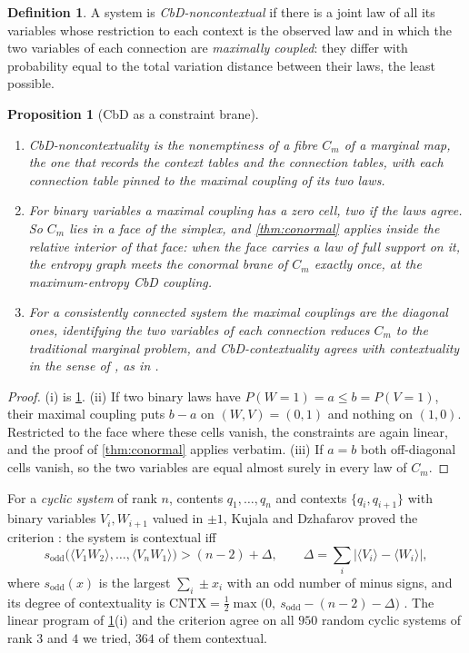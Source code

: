 \documentclass[11pt]{article}
\newtheorem{proposition}[theorem]{Proposition}
\theoremstyle{definition}
\newtheorem{definition}[theorem]{Definition}
\theoremstyle{remark}
\begin{document}
\begin{definition}\label{def:cbd}
A system is \emph{CbD-noncontextual} if there is a joint law of all its variables whose restriction to each context is the observed law
and in which the two variables of each connection are \emph{maximally coupled}: they differ with probability equal to the total variation
distance between their laws, the least possible.
\end{definition}

\begin{proposition}[CbD as a constraint brane]\label{prop:cbdbrane}
\begin{enumerate}[label=(\roman*)]
\item CbD-noncontextuality is the nonemptiness of a fibre $C_m$ of a marginal map, the one that records the context tables and the
  connection tables, with each connection table pinned to the maximal coupling of its two laws.
\item For binary variables a maximal coupling has a zero cell, two if the laws agree. So $C_m$ lies in a face of the simplex, and
  \cref{thm:conormal} applies inside the relative interior of that face: when the face carries a law of full support on it, the entropy
  graph meets the conormal brane of $C_m$ exactly once, at the maximum-entropy CbD coupling.
\item For a consistently connected system the maximal couplings are the diagonal ones, identifying the two variables of each
  connection reduces $C_m$ to the traditional marginal problem, and CbD-contextuality agrees with contextuality in the sense of
  \cite{AbramskyBrandenburger2011}, as in \cite{DzhafarovKujala2016}.
\end{enumerate}
\end{proposition}
\begin{proof}
(i) is \cref{def:cbd}. (ii) If two binary laws have $P(W=1)=a\le b=P(V=1)$, their maximal coupling puts $b-a$ on $(W,V)=(0,1)$ and nothing on
$(1,0)$. Restricted to the face where these cells vanish, the constraints are again linear, and the proof of \cref{thm:conormal} applies
verbatim. (iii) If $a=b$ both off-diagonal cells vanish, so the two variables are equal almost surely in every law of $C_m$.
\end{proof}

For a \emph{cyclic system} of rank $n$, contents $q_1,\dots,q_n$ and contexts $\{q_i,q_{i+1}\}$ with binary variables $V_i,W_{i+1}$ valued in
$\pm1$, Kujala and Dzhafarov proved the criterion \cite{KujalaDzhafarov2016}: the system is contextual iff
\[
s_{\mathrm{odd}}\bigl(\langle V_1W_2\rangle,\dots,\langle V_nW_1\rangle\bigr)>(n-2)+\Delta,\qquad \Delta=\sum_i\bigl\lvert\langle V_i\rangle-\langle W_i\rangle\bigr\rvert,
\]
where $s_{\mathrm{odd}}(x)$ is the largest $\sum_i\pm x_i$ with an odd number of minus signs, and its degree of contextuality is
$\mathrm{CNTX}=\frac12\max\bigl(0,\ s_{\mathrm{odd}}-(n-2)-\Delta\bigr)$ \cite{KujalaDzhafarov2019}. The linear program of
\cref{prop:cbdbrane}(i) and the criterion agree on all $950$ random cyclic systems of rank $3$ and $4$ we tried, $364$ of them contextual.
\end{document}
